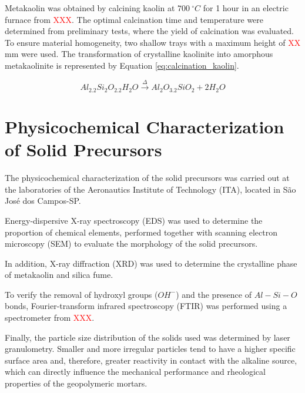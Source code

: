 Metakaolin was obtained by calcining kaolin at $700\ ^\circ C$ for 1 hour in an electric furnace from \textcolor{red}{XXX}.
The optimal calcination time and temperature were determined from preliminary tests, where the yield of calcination was evaluated.
To ensure material homogeneity, two shallow trays with a maximum height of \textcolor{red}{XX} mm were used.
The transformation of crystalline kaolinite into amorphous metakaolinite is represented by Equation \ref{eq:calcination_kaolin}.

\begin{equation}
    \label{eq:calcination_kaolin}
        Al_2.2Si_2O_2.2H_2O \xrightarrow{\Delta} Al_2O_3.2SiO_2 + 2 H_2O
\end{equation}

\section{Physicochemical Characterization of Solid Precursors}
\label{sec:physicochemical_characterization_precursors}

The physicochemical characterization of the solid precursors was carried out at the laboratories of the Aeronautics Institute of Technology (ITA), located in São José dos Campos-SP.

Energy-dispersive X-ray spectroscopy (EDS) was used to determine the proportion of chemical elements, performed together with scanning electron microscopy (SEM) to evaluate the morphology of the solid precursors.

In addition, X-ray diffraction (XRD) was used to determine the crystalline phase of metakaolin and silica fume.

To verify the removal of hydroxyl groups ($OH^-$) and the presence of $Al-Si-O$ bonds, Fourier-transform infrared spectroscopy (FTIR) was performed using a spectrometer from \textcolor{red}{XXX}.


Finally, the particle size distribution of the solids used was determined by laser granulometry. Smaller and more irregular particles tend to have a higher specific surface area and, therefore, greater reactivity in contact with the alkaline source, which can directly influence the mechanical performance and rheological properties of the geopolymeric mortars.

